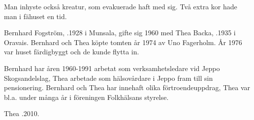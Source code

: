 Man inhyste också kreatur, som evakuerade haft med sig. Två extra kor hade man i fähuset en tid.




Bernhard Fogström, .1928 i Munsala, gifte sig 1960 med Thea Backa, .1935 i Oravais. Bernhard och Thea köpte tomten år 1974 av Uno Fagerholm. År 1976 	var huset färdigbyggt och de kunde flytta in.
\begin{jhchildren}
  \item {}
  \item {}
  \item {}
\end{jhchildren}
Bernhard har åren 1960-1991 arbetat som verksamhetsledare vid Jeppo Skogsandelslag, Thea arbetade som hälsovårdare i Jeppo fram	till sin pensionering. Bernhard och Thea har innehaft olika förtroendeuppdrag, Thea var bl.a. under många år i föreningen Folkhälsans styrelse.

Thea .2010.
